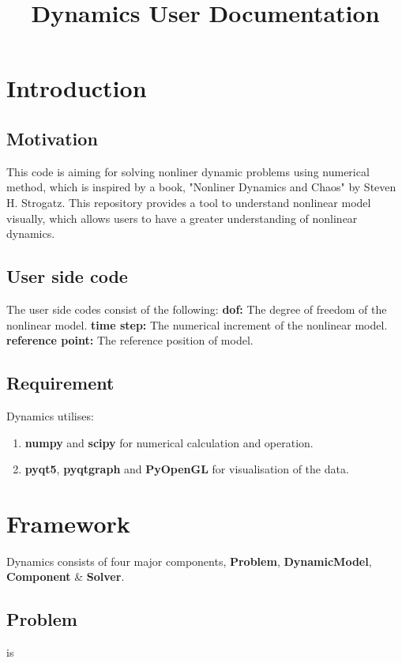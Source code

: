 \documentclass[10pt]{article}
\begin{document}
\title{Dynamics User Documentation}
\maketitle


\section*{Introduction}
\subsection*{Motivation}
This code is aiming for solving nonliner dynamic problems using numerical method,
which is inspired by a book, "Nonliner Dynamics and Chaos" by Steven H. Strogatz.
This repository provides a tool to understand nonlinear model visually, which allows
users to have a greater understanding of nonlinear dynamics.

\subsection*{User side code}
The user side codes consist of the following: \medskip \newline
\textbf{dof:} The degree of freedom of the nonlinear model. \medskip \newline
\textbf{time step:} The numerical increment of the nonlinear model. \medskip \newline
\textbf{reference point:} The reference position of model.

\subsection*{Requirement}
Dynamics utilises:
\begin{enumerate}
    \item \textbf{numpy} and \textbf{scipy} for numerical calculation and 
    operation.
    \item \textbf{pyqt5}, \textbf{pyqtgraph} and \textbf{PyOpenGL} for visualisation
    of the data.
  \end{enumerate}

\section*{Framework}
Dynamics consists of four major components, \textbf{Problem}, \textbf{DynamicModel},
\textbf{Component} \& \textbf{Solver}.
\subsection*{Problem}
is 
\end{document}

